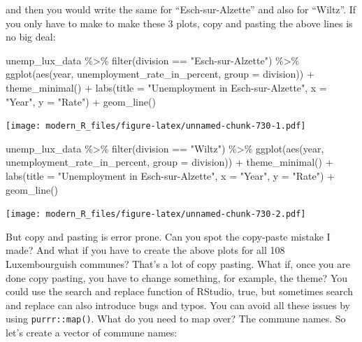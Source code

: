 \documentclass[
]{article}
\newenvironment{Shaded}{\begin{snugshade}}{\end{snugshade}}
\newcommand{\AttributeTok}[1]{\textcolor[rgb]{0.77,0.63,0.00}{#1}}
\newcommand{\FunctionTok}[1]{\textcolor[rgb]{0.00,0.00,0.00}{#1}}
\newcommand{\NormalTok}[1]{#1}
\newcommand{\SpecialCharTok}[1]{\textcolor[rgb]{0.00,0.00,0.00}{#1}}
\newcommand{\StringTok}[1]{\textcolor[rgb]{0.31,0.60,0.02}{#1}}
\begin{document}
and then you would write the same for ``Esch-sur-Alzette'' and also for ``Wiltz''. If you only have to
make to make these 3 plots, copy and pasting the above lines is no big deal:

\begin{Shaded}
\begin{Highlighting}[]
\NormalTok{unemp\_lux\_data }\SpecialCharTok{\%\textgreater{}\%}
  \FunctionTok{filter}\NormalTok{(division }\SpecialCharTok{==} \StringTok{"Esch{-}sur{-}Alzette"}\NormalTok{) }\SpecialCharTok{\%\textgreater{}\%}
  \FunctionTok{ggplot}\NormalTok{(}\FunctionTok{aes}\NormalTok{(year, unemployment\_rate\_in\_percent, }\AttributeTok{group =}\NormalTok{ division)) }\SpecialCharTok{+}
  \FunctionTok{theme\_minimal}\NormalTok{() }\SpecialCharTok{+}
  \FunctionTok{labs}\NormalTok{(}\AttributeTok{title =} \StringTok{"Unemployment in Esch{-}sur{-}Alzette"}\NormalTok{, }\AttributeTok{x =} \StringTok{"Year"}\NormalTok{, }\AttributeTok{y =} \StringTok{"Rate"}\NormalTok{) }\SpecialCharTok{+}
  \FunctionTok{geom\_line}\NormalTok{()}
\end{Highlighting}
\end{Shaded}

\texttt{[image: modern\_R\_files/figure-latex/unnamed-chunk-730-1.pdf]}

\begin{Shaded}
\begin{Highlighting}[]
\NormalTok{unemp\_lux\_data }\SpecialCharTok{\%\textgreater{}\%}
  \FunctionTok{filter}\NormalTok{(division }\SpecialCharTok{==} \StringTok{"Wiltz"}\NormalTok{) }\SpecialCharTok{\%\textgreater{}\%}
  \FunctionTok{ggplot}\NormalTok{(}\FunctionTok{aes}\NormalTok{(year, unemployment\_rate\_in\_percent, }\AttributeTok{group =}\NormalTok{ division)) }\SpecialCharTok{+}
  \FunctionTok{theme\_minimal}\NormalTok{() }\SpecialCharTok{+}
  \FunctionTok{labs}\NormalTok{(}\AttributeTok{title =} \StringTok{"Unemployment in Esch{-}sur{-}Alzette"}\NormalTok{, }\AttributeTok{x =} \StringTok{"Year"}\NormalTok{, }\AttributeTok{y =} \StringTok{"Rate"}\NormalTok{) }\SpecialCharTok{+}
  \FunctionTok{geom\_line}\NormalTok{()}
\end{Highlighting}
\end{Shaded}

\texttt{[image: modern\_R\_files/figure-latex/unnamed-chunk-730-2.pdf]}

But copy and pasting is error prone. Can you spot the copy-paste mistake I made? And what if you
have to create the above plots for all 108 Luxembourguish communes? That's a lot of copy pasting.
What if, once you are done copy pasting, you have to change something, for example, the theme? You
could use the search and replace function of RStudio, true, but sometimes search and replace can
also introduce bugs and typos. You can avoid all these issues by using \texttt{purrr::map()}. What do you
need to map over? The commune names. So let's create a vector of commune names:
\end{document}
